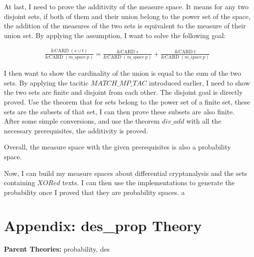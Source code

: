 \documentclass{article}
\begin{document}
At last, I need to prove the additivity of the measure space. It means for any two disjoint sets, if both of them
and their union belong to the power set of the space, the addition of the measures of the two sets is equivalent
to the measure of their union set. By applying the assumption, I want to solve the following goal:

\begin{multline}
\frac{\text{\&CARD} \; (s \cup t)}{\text{\&CARD} \; (m\_space \, p)} = \frac{\text{\&CARD} \; s}{\text{\&CARD} \; (m\_space \, p)} + \frac{\text{\&CARD} \; t}{\text{\&CARD} \; (m\_space \, p)}
\end{multline}

I then want to show the cardinality of the union is equal to the sum of the two sets. By applying the tacitic
$MATCH\_MP\_TAC$ introduced earlier, I need to show the two sets are finite and disjoint from each other. The disjoint
goal is directly proved. Use the theorem that for sets belong to the power set of a finite set, these sets are the subsets
of that set, I can then prove these subsets are also finite. After some simple conversions, and use the theorem $div\_add$
with all the necessary prerequisites, the additivity is proved.

\begin{alltt}
  \HOLTokenTurnstile{}  \HOLSymConst{\HOLTokenIn{}}   \HOLSymConst{\HOLTokenEquiv{}}  \HOLSymConst{\HOLTokenSubset{}} 
\end{alltt}

\begin{alltt}
  \HOLTokenTurnstile{}   \HOLSymConst{\HOLTokenConj{}}  \HOLSymConst{\HOLTokenSubset{}}  \HOLSymConst{\HOLTokenImp{}}  
\end{alltt}

Overall, the measure space with the given prerequisites is also a probability space.

Now, I can build my measure spaces about differential cryptanalysis and the sets containing $XORed$ texts. I can then use
the implementations to generate the probability once I proved that they are probability spaces.
   a





\section{Appendix: des\_prop Theory}
\begin{flushleft}
\textbf{Parent Theories:} probability, des
\end{flushleft}
\end{document}
